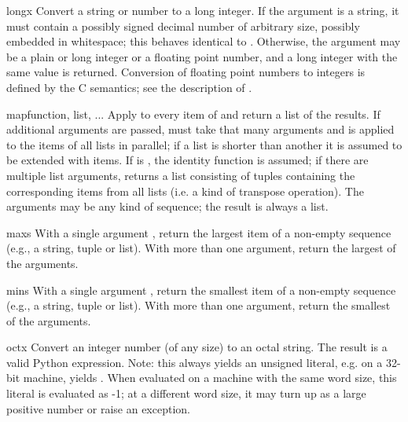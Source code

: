 \begin{funcdesc}{long}{x}
  Convert a string or number to a long integer.  If the argument is a
  string, it must contain a possibly signed decimal number of
  arbitrary size, possibly embedded in whitespace;
  this behaves identical to .
  Otherwise, the argument may be a plain or
  long integer or a floating point number, and a long integer with
  the same value is returned.    Conversion of floating
  point numbers to integers is defined by the C semantics;
  see the description of .
\end{funcdesc}

\begin{funcdesc}{map}{function, list, ...}
Apply  to every item of  and return a list
of the results.  If additional  arguments are passed, 
 must take that many arguments and is applied to
the items of all lists in parallel; if a list is shorter than another
it is assumed to be extended with  items.  If
 is , the identity function is assumed; if
there are multiple list arguments,  returns a list
consisting of tuples containing the corresponding items from all lists
(i.e. a kind of transpose operation).  The  arguments may be
any kind of sequence; the result is always a list.
\end{funcdesc}

\begin{funcdesc}{max}{s}
With a single argument , return the largest item of a
non-empty sequence (e.g., a string, tuple or list).  With more than
one argument, return the largest of the arguments.
\end{funcdesc}

\begin{funcdesc}{min}{s}
With a single argument , return the smallest item of a
non-empty sequence (e.g., a string, tuple or list).  With more than
one argument, return the smallest of the arguments.
\end{funcdesc}

\begin{funcdesc}{oct}{x}
  Convert an integer number (of any size) to an octal string.  The
  result is a valid Python expression.  Note: this always yields
  an unsigned literal, e.g. on a 32-bit machine,  yields
  .  When evaluated on a machine with the same
  word size, this literal is evaluated as -1; at a different word
  size, it may turn up as a large positive number or raise an
   exception.
\end{funcdesc}

